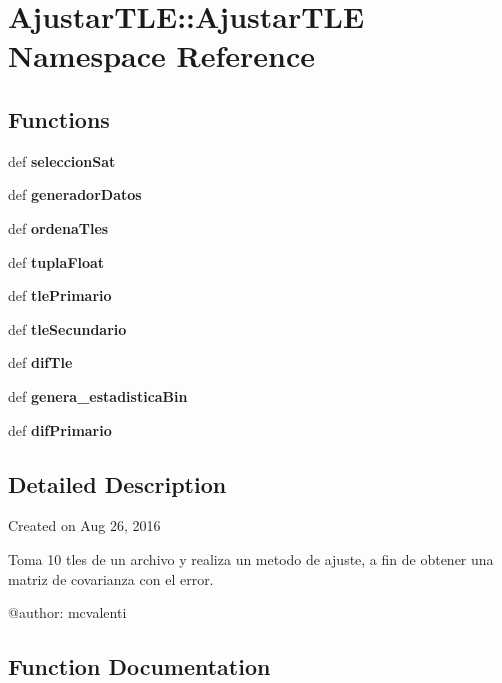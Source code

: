 \section{\-Ajustar\-T\-L\-E\-:\-:\-Ajustar\-T\-L\-E \-Namespace \-Reference}
\label{namespace_ajustar_t_l_e_1_1_ajustar_t_l_e}
\subsection*{\-Functions}
\begin{DoxyCompactItemize}
\item 
def {\bf seleccion\-Sat}
\item 
def {\bf generador\-Datos}
\item 
def {\bf ordena\-Tles}
\item 
def {\bf tupla\-Float}
\item 
def {\bf tle\-Primario}
\item 
def {\bf tle\-Secundario}
\item 
def {\bf dif\-Tle}
\item 
def {\bf genera\-\_\-estadistica\-Bin}
\item 
def {\bf dif\-Primario}
\end{DoxyCompactItemize}


\subsection{\-Detailed \-Description}
\begin{DoxyVerb}
Created on Aug 26, 2016

Toma 10 tles de un archivo y realiza un metodo de ajuste,
a fin de obtener una matriz de covarianza con el error.

@author: mcvalenti
\end{DoxyVerb}
 

\subsection{\-Function \-Documentation}
